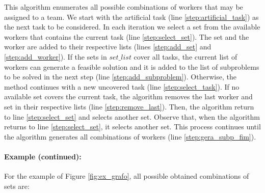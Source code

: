 \documentclass{singlecol-new}
\begin{document}
This algorithm enumerates all possible combinations of workers that may be assigned to a team. We start with the artificial task (line \ref{step:artificial_task}) as the next task to be considered. In each iteration we select a set from the available workers that contains the current task (line \ref{step:select_set}). The set and the worker are added to their respective lists (lines \ref{step:add_set} and \ref{step:add_worker}). If the sets in $set\_list$ cover all tasks, the current list of workers can generate a feasible solution and it is added to the list of subproblems to be solved in the next step (line \ref{step:add_subproblem}). Otherwise, the method continues with a new uncovered task (line \ref{step:select_task}). If no available set covers the current task, the algorithm removes the last worker and set in their respective lists (line \ref{step:remove_last}). Then, the algorithm return to line \ref{step:select_set} and selects another set. Observe that, when the algorithm returns to line \ref{step:select_set}, it selects another set. This process continues until the algorithm generates all combinations of workers (line \ref{step:gera_subp_fim}).

\newpage
\paragraph{Example (continued):} For the example of Figure \ref{fig:ex_grafo}, all possible obtained combinations of sets are:
\end{document}

